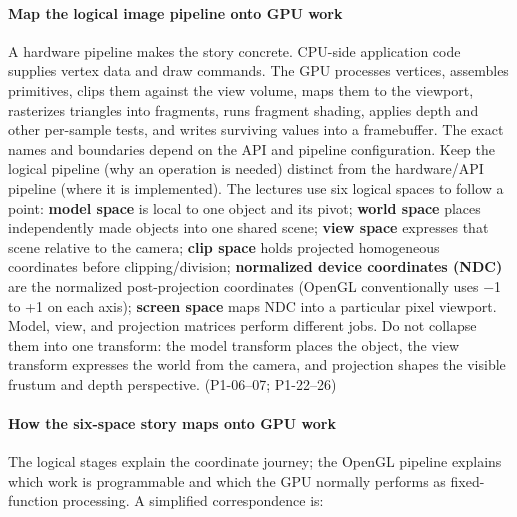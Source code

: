 \paragraph{Map the logical image pipeline onto GPU work}\label{map-the-logical-image-pipeline-onto-gpu-work}

A hardware pipeline makes the story concrete. CPU-side application code supplies vertex data and draw commands. The GPU processes vertices, assembles primitives, clips them against the view volume, maps them to the viewport, rasterizes triangles into fragments, runs fragment shading, applies depth and other per-sample tests, and writes surviving values into a framebuffer. The exact names and boundaries depend on the API and pipeline configuration. Keep the logical pipeline (why an operation is needed) distinct from the hardware/API pipeline (where it is implemented). The lectures use six logical spaces to follow a point: \textbf{model space} is local to one object and its pivot; \textbf{world space} places independently made objects into one shared scene; \textbf{view space} expresses that scene relative to the camera; \textbf{clip space} holds projected homogeneous coordinates before clipping/division; \textbf{normalized device coordinates (NDC)} are the normalized post-projection coordinates (OpenGL conventionally uses −1 to +1 on each axis); \textbf{screen space} maps NDC into a particular pixel viewport. Model, view, and projection matrices perform different jobs. Do not collapse them into one transform: the model transform places the object, the view transform expresses the world from the camera, and projection shapes the visible frustum and depth perspective. (P1-06--07; P1-22--26)

\paragraph{How the six-space story maps onto GPU work}\label{how-the-six-space-story-maps-onto-gpu-work}

The logical stages explain the coordinate journey; the OpenGL pipeline explains which work is programmable and which the GPU normally performs as fixed-function processing. A simplified correspondence is:

